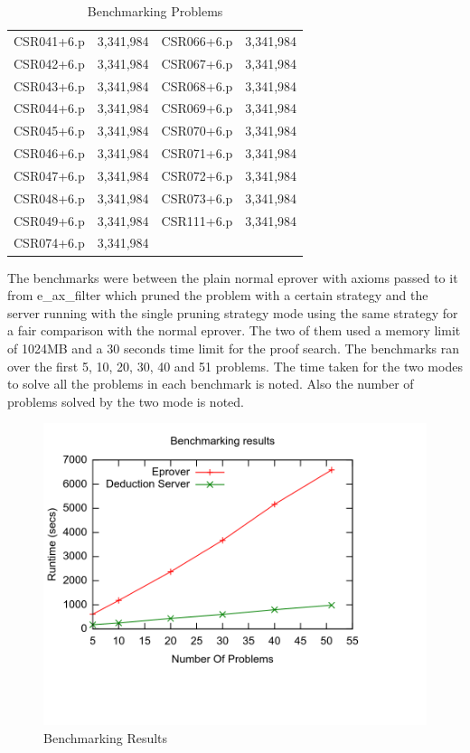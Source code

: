 \begin{table}[ht]
\begin{center}
\begin{tabular}{c|c||c|c}
      CSR041+6.p   & 3,341,984          & CSR066+6.p   & 3,341,984 \\
      CSR042+6.p   & 3,341,984          & CSR067+6.p   & 3,341,984 \\
      CSR043+6.p   & 3,341,984          & CSR068+6.p   & 3,341,984 \\
      CSR044+6.p   & 3,341,984          & CSR069+6.p   & 3,341,984 \\
      CSR045+6.p   & 3,341,984          & CSR070+6.p   & 3,341,984 \\
      CSR046+6.p   & 3,341,984          & CSR071+6.p   & 3,341,984 \\
      CSR047+6.p   & 3,341,984          & CSR072+6.p   & 3,341,984 \\
      CSR048+6.p   & 3,341,984          & CSR073+6.p   & 3,341,984 \\
      CSR049+6.p   & 3,341,984          & CSR111+6.p   & 3,341,984 \\
      CSR074+6.p   & 3,341,984          &              &           \\
      \bottomrule
    \end{tabular}
  \end{center}
\caption{Benchmarking Problems}
\label{Table:BenchmarkingProblems}
\end{table}

The benchmarks were between the plain normal eprover with axioms passed to it from e\_ax\_filter which pruned the problem with a certain strategy and the server running with the single pruning strategy mode using the same strategy for a fair comparison with the normal eprover. The two of them used a memory limit of 1024MB and a 30 seconds time limit for the proof search. The benchmarks ran over the first 5, 10, 20, 30, 40 and 51 problems. The time taken for the two modes to solve all the problems in each benchmark is noted. Also the number of problems solved by the two mode is noted.

\begin{figure}[ht!]
  \centering
  \includegraphics[width=150mm]{graphics/BenchmarkingResults.png}
  \caption{Benchmarking Results\label{benchmarking_results}}
\end{figure}

